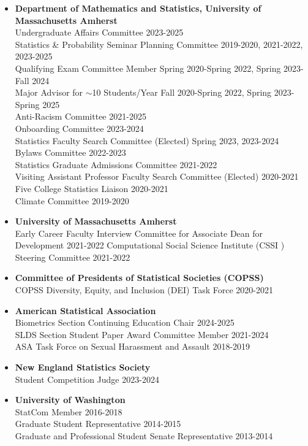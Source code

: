 \documentclass[11pt]{article}
\begin{document}
\begin{itemize} 
	\item[] \textbf{Department of Mathematics and Statistics, University of Massachusetts Amherst} \\ 
	Undergraduate Affairs Committee \hfill 2023-2025\\
	Statistics \& Probability Seminar Planning Committee \hfill 2019-2020, 2021-2022, 2023-2025 \\
	Qualifying Exam Committee Member \hfill Spring 2020-Spring 2022, Spring 2023-Fall 2024  \\ 
	Major Advisor for $\sim$10 Students/Year \hfill Fall 2020-Spring 2022, Spring 2023-Spring 2025 \\
	Anti-Racism Committee \hfill 2021-2025 \\
	Onboarding Committee \hfill 2023-2024 \\
	Statistics Faculty Search Committee (Elected) \hfill Spring 2023, 2023-2024 \\
	Bylaws Committee \hfill 2022-2023\\
	Statistics Graduate Admissions Committee \hfill 2021-2022 \\
	Visiting Assistant Professor Faculty Search Committee (Elected) \hfill 2020-2021 \\
	Five College Statistics Liaison \hfill 2020-2021 \\
	Climate Committee \hfill 2019-2020\vspace{-2mm}
	\item[] \textbf{University of Massachusetts Amherst} \\ 
	Early Career Faculty Interview Committee for Associate Dean for Development \hfill 2021-2022
	Computational Social Science Institute (CSSI ) Steering Committee \hfill 2021-2022\vspace{-2mm}
	\item[] \textbf{Committee of Presidents of Statistical Societies (COPSS)} \\ 
	COPSS Diversity, Equity, and Inclusion (DEI) Task Force \hfill 2020-2021\vspace{-2mm}
	\item[] \textbf{American Statistical Association} \\ 
	Biometrics Section Continuing Education Chair \hfill 2024-2025 \\
	SLDS Section Student Paper Award Committee Member \hfill 2021-2024 \\
	ASA Task Force on Sexual Harassment and Assault \hfill 2018-2019\vspace{-2mm}
	\item[] \textbf{New England Statistics Society} \\ 
	Student Competition Judge \hfill 2023-2024\vspace{-2mm}
	\item[] \textbf{University of Washington} \\
	StatCom Member \hfill 2016-2018 \\
	Graduate Student Representative \hfill 2014-2015 \\
	Graduate and Professional Student Senate Representative \hfill 2013-2014\vspace{-2mm}
\end{itemize}
\end{document}
